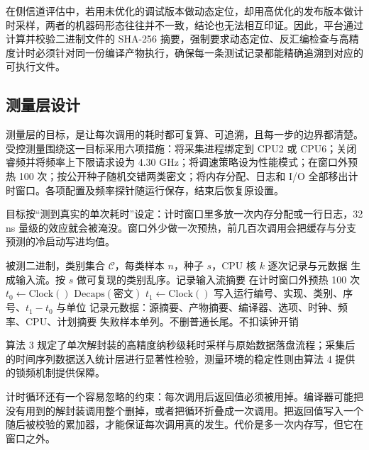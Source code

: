在侧信道评估中，若用未优化的调试版本做动态定位，却用高优化的发布版本做计时采样，两者的机器码形态往往并不一致，结论也无法相互印证。因此，平台通过计算并校验二进制文件的 SHA-256 摘要，强制要求动态定位、反汇编检查与高精度计时必须针对同一份编译产物执行，确保每一条测试记录都能精确追溯到对应的可执行文件。

\subsection{测量层设计}

测量层的目标，是让每次调用的耗时都可复算、可追溯，且每一步的边界都清楚。受控测量围绕这一目标采用六项措施：将采集进程绑定到 CPU2 或 CPU6；关闭睿频并将频率上下限请求设为 4.30 GHz；将调速策略设为性能模式；在窗口外预热 100 次；按公开种子随机交错两类密文；将内存分配、日志和 I/O 全部移出计时窗口。各项配置及频率探针随运行保存，结束后恢复原设置。


目标按“测到真实的单次耗时”设定：计时窗口里多放一次内存分配或一行日志，32 ns 量级的效应就会被淹没。窗口外少做一次预热，前几百次调用会把缓存与分支预测的冷启动写进均值。

\begin{algorithm}[H]
\caption{单次解封装的计时循环}
\label{alg:timing}
\begin{algorithmic}[1]
\Require 被测二进制，类别集合 $\mathcal{C}$，每类样本 $n$，种子 $s$，CPU 核 $k$
\Ensure 逐次记录与元数据
\State 生成输入流。按 $s$ 做可复现的类别乱序。记录输入流摘要
\State 在计时窗口外预热 100 次
  \State $t_0 \gets \mathrm{Clock}()$
  \State $\mathrm{Decaps}(\text{密文})$ 
  \State $t_1 \gets \mathrm{Clock}()$
  \State 写入运行编号、实现、类别、序号、$t_1-t_0$ 与单位
\EndFor
\State 记录元数据：源摘要、产物摘要、编译器、选项、时钟、频率、CPU、计划摘要
\State 失败样本单列。不删普通长尾。不扣读钟开销
\end{algorithmic}
\end{algorithm}

算法 3 规定了单次解封装的高精度纳秒级耗时采样与原始数据落盘流程；采集后的时间序列数据送入统计层进行显著性检验，测量环境的稳定性则由算法 4 提供的锁频机制提供保障。

计时循环还有一个容易忽略的约束：每次调用后返回值必须被用掉。编译器可能把没有用到的解封装调用整个删掉，或者把循环折叠成一次调用。把返回值写入一个随后被校验的累加器，才能保证每次调用真的发生。代价是多一次内存写，但它在窗口之外。

